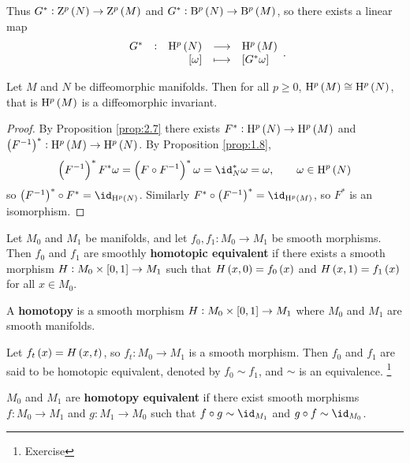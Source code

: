 Thus $ G^* : \Z^p\br{N} \to \Z^p\br{M} $ and $ G^* : \B^p\br{N} \to \B^p\br{M} $, so there exists a linear map
$$ \function[G^*]{\H^p\br{N}}{\H^p\br{M}}{\sbr{\omega}}{\sbr{G^*\omega}}. $$

\begin{proposition}
Let $ M $ and $ N $ be diffeomorphic manifolds. Then for all $ p \ge 0 $, $ \H^p\br{M} \cong \H^p\br{N} $, that is $ \H^p\br{M} $ is a diffeomorphic invariant.
\end{proposition}

\begin{proof}
By Proposition \ref{prop:2.7} there exists $ F^* : \H^p\br{N} \to \H^p\br{M} $ and $ \br{F^{-1}}^* : \H^p\br{M} \to \H^p\br{N} $. By Proposition \ref{prop:1.8},
$$ \br{F^{-1}}^*F^*\omega = \br{F \circ F^{-1}}^*\omega = \id_N^*\omega = \omega, \qquad \omega \in \H^p\br{N} $$
so $ \br{F^{-1}}^* \circ F^* = \id_{\H^p\br{N}} $. Similarly $ F^* \circ \br{F^{-1}}^* = \id_{\H^p\br{M}} $, so $ F^* $ is an isomorphism.
\end{proof}

\begin{definition}
Let $ M_0 $ and $ M_1 $ be manifolds, and let $ f_0, f_1 : M_0 \to M_1 $ be smooth morphisms. Then $ f_0 $ and $ f_1 $ are smoothly \textbf{homotopic equivalent} if there exists a smooth morphism $ H : M_0 \times \sbr{0, 1} \to M_1 $ such that $ H\br{x, 0} = f_0\br{x} $ and $ H\br{x, 1} = f_1\br{x} $ for all $ x \in M_0 $.
\end{definition}


A \textbf{homotopy} is a smooth morphism $ H : M_0 \times \sbr{0, 1} \to M_1 $ where $ M_0 $ and $ M_1 $ are smooth manifolds.

\begin{notation}
Let $ f_t\br{x} = H\br{x, t} $, so $ f_t : M_0 \to M_1 $ is a smooth morphism. Then $ f_0 $ and $ f_1 $ are said to be homotopic equivalent, denoted by $ f_0 \sim f_1 $, and $ \sim $ is an equivalence. \footnote{Exercise}
\end{notation}

\begin{definition}
$ M_0 $ and $ M_1 $ are \textbf{homotopy equivalent} if there exist smooth morphisms $ f : M_0 \to M_1 $ and $ g : M_1 \to M_0 $ such that $ f \circ g \sim \id_{M_1} $ and $ g \circ f \sim \id_{M_0} $.
\end{definition}

